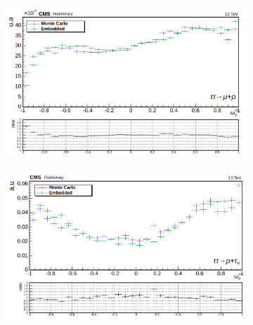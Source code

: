 \begin{figure}[!ht]
    \begin{subfigure}[b]{0.5\linewidth}
    \centering
    \includegraphics[width=\linewidth]{Chapitre6/Images/OptVar/omegavis_rho_rhomu.png} 
    \caption*{} 
    \vspace{0.5ex}
  \end{subfigure}%
  \begin{subfigure}[b]{0.5\linewidth}
    \centering
    \includegraphics[width=\linewidth]{Chapitre6/Images/OptVar/omegavis_rho_rhotauh.png} 
    \caption*{} 
    \vspace{0.5ex}
  \end{subfigure}


\end{figure}
